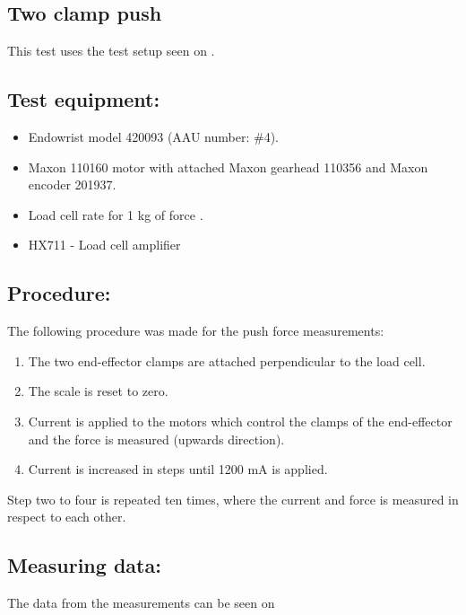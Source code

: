 \subsection{Two clamp push} %
This test uses the test setup seen on .

\subsection*{Test equipment:}
\begin{itemize}
\item Endowrist model 420093 (AAU number: \#4).
\item Maxon 110160 motor with attached Maxon gearhead 110356 and Maxon encoder 201937.
\item Load cell rate for 1 kg of force \cite{Load_cell_1kg}.
\item HX711 - Load cell amplifier \cite{HX711}
\end{itemize}

\subsection*{Procedure:}
The following procedure was made for the push force measurements:
\begin{enumerate}
\item The two end-effector clamps are attached perpendicular to the load cell. 
\item The scale is reset to zero.
\item Current is applied to the motors which control the clamps of the end-effector and the force is measured (upwards direction).
\item Current is increased in steps until 1200 mA is applied.
\end{enumerate}
Step two to four is repeated ten times, where the current and force is measured in respect to each other. 

\subsection*{Measuring data:}
The data from the measurements can be seen on %




